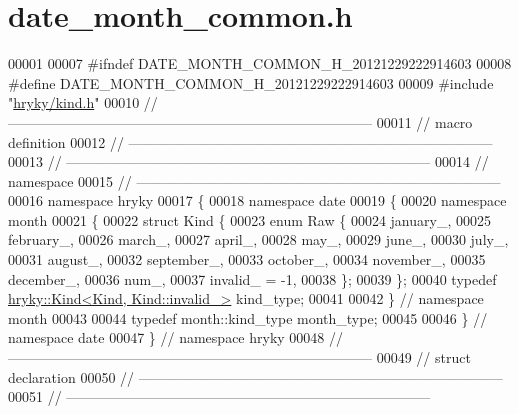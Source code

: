 \hypertarget{date__month__common_8h_source}{\section{date\-\_\-month\-\_\-common.\-h}
}

\begin{DoxyCode}
00001 
00007 \textcolor{preprocessor}{#ifndef DATE\_MONTH\_COMMON\_H\_20121229222914603}
00008 \textcolor{preprocessor}{}\textcolor{preprocessor}{#define DATE\_MONTH\_COMMON\_H\_20121229222914603}
00009 \textcolor{preprocessor}{}\textcolor{preprocessor}{#include "\hyperlink{kind_8h}{hryky/kind.h}"}
00010 \textcolor{comment}{//
      ------------------------------------------------------------------------------}
00011 \textcolor{comment}{// macro definition}
00012 \textcolor{comment}{//
      ------------------------------------------------------------------------------}
00013 \textcolor{comment}{//
      ------------------------------------------------------------------------------}
00014 \textcolor{comment}{// namespace}
00015 \textcolor{comment}{//
      ------------------------------------------------------------------------------}
00016 \textcolor{keyword}{namespace }hryky
00017 \{
00018 \textcolor{keyword}{namespace }date
00019 \{
00020 \textcolor{keyword}{namespace }month
00021 \{
00022     \textcolor{keyword}{struct }Kind \{
00023         \textcolor{keyword}{enum} Raw \{
00024             january\_,
00025             february\_,
00026             march\_,
00027             april\_,
00028             may\_,
00029             june\_,
00030             july\_,
00031             august\_,
00032             september\_,
00033             october\_,
00034             november\_,
00035             december\_,
00036             num\_,
00037             invalid\_ = -1,
00038         \};
00039     \};
00040     \textcolor{keyword}{typedef} \hyperlink{classhryky_1_1_kind}{hryky::Kind<Kind, Kind::invalid_>} kind\_type;
00041 
00042 \} \textcolor{comment}{// namespace month}
00043 
00044     \textcolor{keyword}{typedef} month::kind\_type month\_type;
00045 
00046 \} \textcolor{comment}{// namespace date}
00047 \} \textcolor{comment}{// namespace hryky}
00048 \textcolor{comment}{//
      ------------------------------------------------------------------------------}
00049 \textcolor{comment}{// struct declaration}
00050 \textcolor{comment}{//
      ------------------------------------------------------------------------------}
00051 \textcolor{comment}{//
      ------------------------------------------------------------------------------}

\end{DoxyCode}
